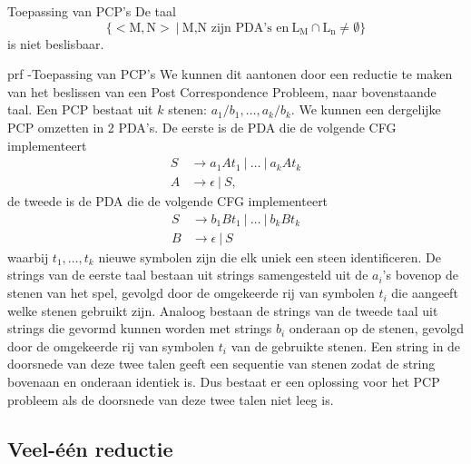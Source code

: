 \vspace{0.5cm}

\begin{lem}{Toepassing van PCP's}
    De taal 
    \begin{equation*}
        \{ < \text{M}, \text{N} > \ | \ \text{M,N zijn PDA's en} \ \text{L}_{\text{M}} \cap \text{L}_{\text{n}} \neq \emptyset \}
    \end{equation*}
    is niet beslisbaar.
\end{lem}

\begin{prf}{prf -Toepassing van PCP's}
    We kunnen dit aantonen door een reductie te maken van het beslissen van een Post Correspondence Probleem, naar bovenstaande taal. Een PCP bestaat uit $k$ stenen: $a_1/b_1, \ldots, a_k/b_k$. We kunnen een dergelijke PCP omzetten in 2 PDA's. De eerste is de PDA die de volgende CFG implementeert
    \begin{align*}
        S &\to a_1 A t_1 \ | \ \ldots \ | \ a_k A t_k \\
        A &\to \epsilon \ | \ S,
    \end{align*}
    de tweede is de PDA die de volgende CFG implementeert
    \begin{align*}
        S &\to b_1 B t_1 \ | \ \ldots \ | \ b_k B t_k \\
        B &\to \epsilon \ | \ S
    \end{align*}
    waarbij $t_1, \ldots, t_k$ nieuwe symbolen zijn die elk uniek een steen identificeren. De strings van de eerste taal bestaan uit strings samengesteld uit de $a_i$'s bovenop de stenen van het spel, gevolgd door de omgekeerde rij van symbolen $t_i$ die aangeeft welke stenen gebruikt zijn. Analoog bestaan de strings van de tweede taal uit strings die gevormd kunnen worden met strings $b_i$ onderaan op de stenen, gevolgd door de omgekeerde rij van symbolen $t_i$ van de gebruikte stenen. Een string in de doorsnede van deze twee talen geeft een sequentie van stenen zodat de string bovenaan en onderaan identiek is. Dus bestaat er een oplossing voor het PCP probleem als de doorsnede van deze twee talen niet leeg is.
\end{prf}

\newpage

\subsection{Veel-één reductie}

